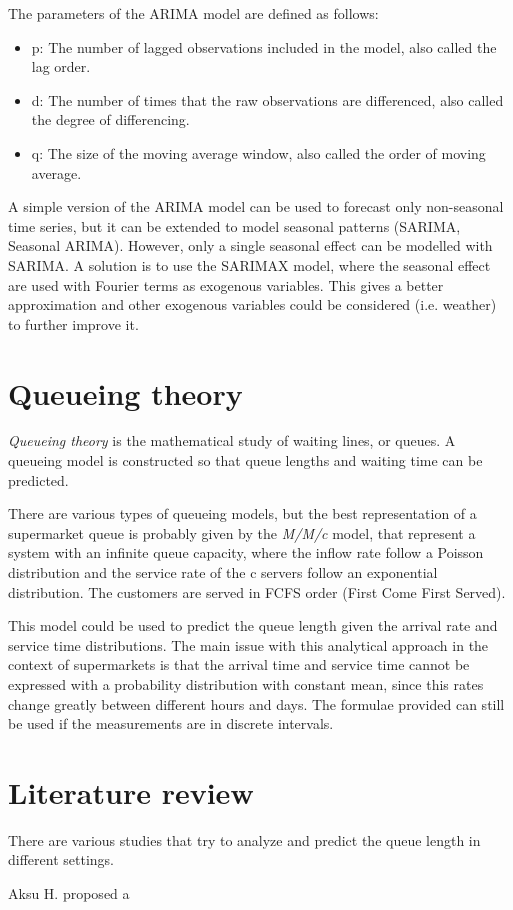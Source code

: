The parameters of the ARIMA model are defined as follows:
\begin{itemize}
  \item p: The number of lagged observations included in the model, also called the lag order.
  \item d: The number of times that the raw observations are differenced, also called the degree of differencing.
  \item q: The size of the moving average window, also called the order of moving average.
\end{itemize}

A simple version of the ARIMA model can be used to forecast only non-seasonal time series, but it can be extended to model seasonal patterns (SARIMA, Seasonal ARIMA). However, only a single seasonal effect can be modelled with SARIMA. A solution is to use the SARIMAX model, where the seasonal effect are used with Fourier terms as exogenous variables. This gives a better approximation and other exogenous variables could be considered (i.e. weather) to further improve it.


\section{Queueing theory}
\label{sec:queueing_theory}

\emph{Queueing theory} is the mathematical study of waiting lines, or queues. A queueing model is constructed so that queue lengths and waiting time can be predicted.

There are various types of queueing models, but the best representation of a supermarket queue is probably given by the \emph{M/M/c} model, that represent a system with an infinite queue capacity, where the inflow rate follow a Poisson distribution and the service rate of the c servers follow an exponential distribution. The customers are served in FCFS order (First Come First Served).

This model could be used to predict the queue length given the arrival rate and service time distributions.
The main issue with this analytical approach in the context of supermarkets is that the arrival time and service time cannot be expressed with a probability distribution with constant mean, since this rates change greatly between different hours and days. The formulae provided can still be used if the measurements are in discrete intervals.



\section{Literature review}
\label{sec:literature_review}

There are various studies that try to analyze and predict the queue length in different settings.

Aksu H. \cite{aksu} proposed a

\section{}